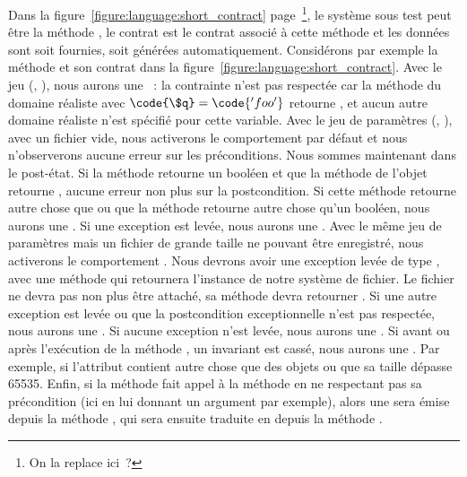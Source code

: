 \begin{example}

Dans la figure~\ref{figure:language:short_contract}
page~\pageref{figure:language:short_contract}\footnote{On la replace ici~?}, le
système sous test peut être la méthode , le contrat est le contrat
associé à cette méthode et les données sont soit fournies, soit générées
automatiquement. Considérons par exemple la méthode  et son contrat
dans la figure~\ref{figure:language:short_contract}.
%
Avec le jeu (, ), nous aurons une ~: la contrainte  n'est pas respectée car la
méthode  du domaine réaliste  avec $\code{\$q}
= \code{'foo'}$ retourne , et aucun autre domaine réaliste n'est
spécifié pour cette variable.
%
Avec le jeu de paramètres (, ), avec un fichier
vide, nous activerons le comportement par défaut et nous n'observerons aucune
erreur sur les préconditions. Nous sommes maintenant dans le post-état. Si la
méthode  retourne un booléen et que la méthode  de
l'objet  retourne , aucune erreur non plus sur la
postcondition.  Si cette méthode retourne autre chose que  ou que la
méthode  retourne autre chose qu'un booléen, nous aurons une
. Si une exception est levée, nous aurons une
.
%
Avec le même jeu de paramètres mais un fichier de grande taille ne pouvant être
enregistré, nous activerons le comportement . Nous devrons avoir une
exception levée de type , avec une méthode
 qui retournera l'instance de notre système de fichier. Le
fichier ne devra pas non plus être attaché, \ie sa méthode 
devra retourner . Si une autre exception est levée ou que la
postcondition exceptionnelle n'est pas respectée, nous aurons une
. Si aucune exception n'est levée, nous aurons une
.
%
Si avant ou après l'exécution de la méthode , un invariant est
cassé, nous aurons une . Par exemple, si l'attribut
 contient autre chose que des objets  ou que sa taille
dépasse 65535.
%
Enfin, si la méthode  fait appel à la méthode  en ne
respectant pas sa précondition (ici en lui donnant un argument par exemple),
alors une  sera émise depuis la méthode
, qui sera ensuite traduite en  depuis la méthode .

\end{example}

